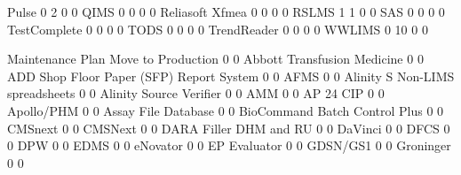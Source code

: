 \documentclass{article}
\begin{document}
\begin{Schunk}
\begin{Soutput}
  Pulse                                       0            2            0    0
  QIMS                                        0            0            0    0
  Reliasoft Xfmea                             0            0            0    0
  RSLMS                                       1            1            0    0
  SAS                                         0            0            0    0
  TestComplete                                0            0            0    0
  TODS                                        0            0            0    0
  TrendReader                                 0            0            0    0
  WWLIMS                                      0           10            0    0
                                          
                                           Maintenance Plan Move to Production
                                                          0                  0
  Abbott Transfusion Medicine                             0                  0
  ADD Shop Floor Paper (SFP) Report System                0                  0
  AFMS                                                    0                  0
  Alinity S Non-LIMS spreadsheets                         0                  0
  Alinity Source Verifier                                 0                  0
  AMM                                                     0                  0
  AP 24 CIP                                               0                  0
  Apollo/PHM                                              0                  0
  Assay File Database                                     0                  0
  BioCommand Batch Control Plus                           0                  0
  CMSnext                                                 0                  0
  CMSNext                                                 0                  0
  DARA Filler DHM and RU                                  0                  0
  DaVinci                                                 0                  0
  DFCS                                                    0                  0
  DPW                                                     0                  0
  EDMS                                                    0                  0
  eNovator                                                0                  0
  EP Evaluator                                            0                  0
  GDSN/GS1                                                0                  0
  Groninger                                               0                  0

\end{Soutput}
\end{Schunk}
\end{document}
